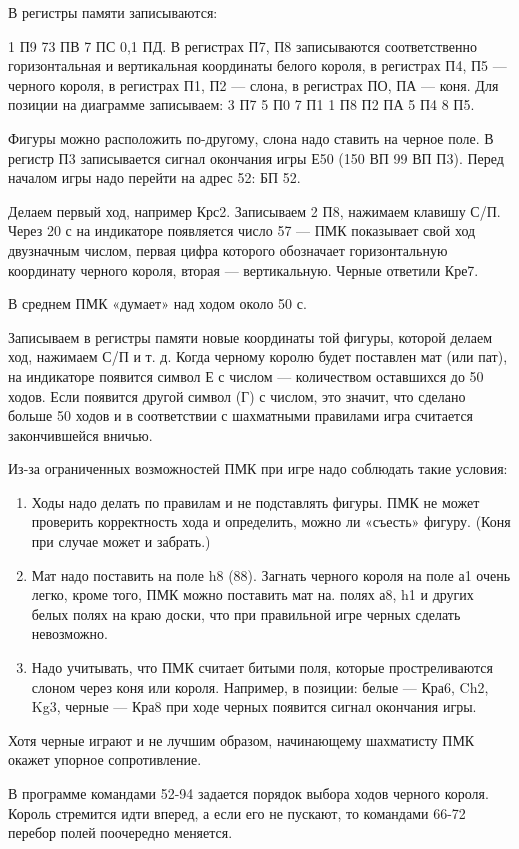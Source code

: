 \documentclass[11pt,a4paper,oneside]{article}
\begin{document}
В регистры памяти записываются:

1 П9 73 ПВ 7 ПС 0,1 ПД. В регистрах П7, П8 записываются соответственно горизонтальная и вертикальная координаты белого короля, в регистрах П4, П5 — черного короля, в регистрах П1, П2 — слона, в регистрах ПО, ПА — коня. Для позиции на диаграмме записываем: 3 П7 5 П0 7 П1 1 П8 П2 ПА 5 П4 8 П5.

Фигуры можно расположить по-другому, слона надо ставить на черное поле. В регистр П3 записывается сигнал окончания игры Е50 (150 ВП 99 ВП П3). Перед началом игры надо перейти на адрес 52: БП 52.

Делаем первый ход, например Крс2. Записываем 2 П8, нажимаем клавишу С/П. Через 20 с на индикаторе появляется число 57 — ПМК показывает свой ход двузначным числом, первая цифра которого обозначает горизонтальную координату черного короля, вторая — вертикальную. Черные ответили Кре7.

В среднем ПМК «думает» над ходом около 50 с.

Записываем в регистры памяти новые координаты той фигуры, которой делаем ход, нажимаем С/П и т. д. Когда черному королю будет поставлен мат (или пат), на индикаторе появится символ Е с числом — количеством оставшихся до 50 ходов. Если появится другой символ (Г) с числом, это значит, что сделано больше 50 ходов и в соответствии с шахматными правилами игра считается закончившейся вничью.

Из-за ограниченных возможностей ПМК при игре надо соблюдать такие условия:
\begin{enumerate}
\item Ходы надо делать по правилам и не подставлять фигуры. ПМК не может проверить корректность хода и определить, можно ли «съесть» фигуру. (Коня при случае может и забрать.)
\item Мат надо поставить на поле h8 (88). Загнать черного короля на поле а1 очень легко, кроме того, ПМК можно поставить мат на. полях а8, h1 и других белых полях на краю доски, что при правильной игре черных сделать невозможно.
\item Надо учитывать, что ПМК считает битыми поля, которые простреливаются слоном через коня или короля. Например, в позиции: белые — Кра6, Ch2, Kg3, черные — Кра8 при ходе черных появится сигнал окончания игры.
\end{enumerate}

Хотя черные играют и не лучшим образом, начинающему шахматисту ПМК окажет упорное сопротивление.

В программе командами 52-94 задается порядок выбора ходов черного короля. Король стремится идти вперед, а если его не пускают, то командами 66-72 перебор полей поочередно меняется.
\end{document}
